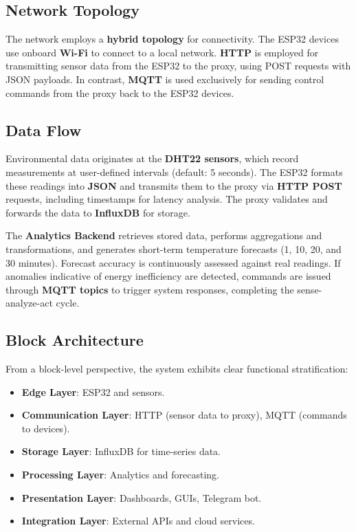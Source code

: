 \documentclass[journal]{IEEEtran}
\begin{document}
\subsection{Network Topology}

The network employs a \textbf{hybrid topology} for connectivity. The ESP32 devices use onboard \textbf{Wi-Fi} to connect to a local network. \textbf{HTTP} is employed for transmitting sensor data from the ESP32 to the proxy, using POST requests with JSON payloads. In contrast, \textbf{MQTT} is used exclusively for sending control commands from the proxy back to the ESP32 devices.

\subsection{Data Flow}

Environmental data originates at the \textbf{DHT22 sensors}, which record measurements at user-defined intervals (default: 5 seconds). The ESP32 formats these readings into \textbf{JSON} and transmits them to the proxy via \textbf{HTTP POST} requests, including timestamps for latency analysis. The proxy validates and forwards the data to \textbf{InfluxDB} for storage.

The \textbf{Analytics Backend} retrieves stored data, performs aggregations and transformations, and generates short-term temperature forecasts (1, 10, 20, and 30 minutes). Forecast accuracy is continuously assessed against real readings. If anomalies indicative of energy inefficiency are detected, commands are issued through \textbf{MQTT topics} to trigger system responses, completing the sense-analyze-act cycle.

\subsection{Block Architecture}

From a block-level perspective, the system exhibits clear functional stratification:

\begin{itemize}
    \item \textbf{Edge Layer}: ESP32 and sensors.
    \item \textbf{Communication Layer}: HTTP (sensor data to proxy), MQTT (commands to devices).
    \item \textbf{Storage Layer}: InfluxDB for time-series data.
    \item \textbf{Processing Layer}: Analytics and forecasting.
    \item \textbf{Presentation Layer}: Dashboards, GUIs, Telegram bot.
    \item \textbf{Integration Layer}: External APIs and cloud services.
\end{itemize}
\end{document}
